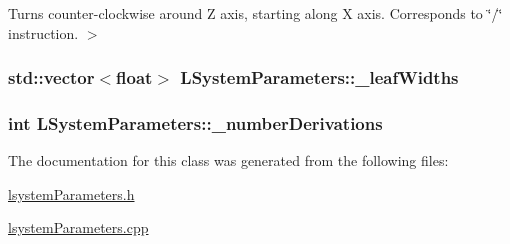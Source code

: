Turns counter-\/clockwise around Z axis, starting along X axis. Corresponds to \char`\"{}/\char`\"{} instruction. $>$ 

\hypertarget{classLSystemParameters_afdad1e5edf4a2d3f00012f0ad8d5d6f3}{
\subsubsection[{\-\_\-leaf\-Widths}]{\setlength{\rightskip}{0pt plus 5cm}std\-::vector$<$float$>$ L\-System\-Parameters\-::\-\_\-leaf\-Widths\hspace{0.3cm}{\ttfamily [private]}}}\label{classLSystemParameters_afdad1e5edf4a2d3f00012f0ad8d5d6f3}
\hypertarget{classLSystemParameters_aa6c15efa6da78e759317beebcd63072d}{
\subsubsection[{\-\_\-number\-Derivations}]{\setlength{\rightskip}{0pt plus 5cm}int L\-System\-Parameters\-::\-\_\-number\-Derivations\hspace{0.3cm}{\ttfamily [private]}}}\label{classLSystemParameters_aa6c15efa6da78e759317beebcd63072d}


The documentation for this class was generated from the following files\-:\begin{DoxyCompactItemize}
\item 
\hyperlink{lsystemParameters_8h}{lsystem\-Parameters.\-h}\item 
\hyperlink{lsystemParameters_8cpp}{lsystem\-Parameters.\-cpp}\end{DoxyCompactItemize}
